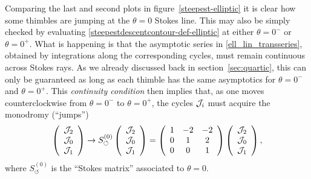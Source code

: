 \documentclass[11pt,a4paper]{article}
\newcommand{\CJ}{{\cal J}}
\begin{document}
Comparing the last and second plots in figure~\ref{steepest-elliptic} it is clear how some thimbles are jumping at the $\theta=0$ Stokes line. This may also be simply checked by evaluating \eqref{steepestdescentcontour-def-elliptic} at either $\theta=0^-$ or $\theta=0^+$. What is happening is that the asymptotic series in \eqref{ell_lin_transseries}, obtained by integrations along the corresponding cycles, must remain continuous across Stokes rays. As we already discussed back in section~\ref{sec:quartic}, this can only be guaranteed as long as each thimble has the same asymptotics for $\theta=0^-$ and $\theta=0^+$. This \textit{continuity condition} then implies that, as one moves counterclockwise from $\theta=0^-$ to $\theta=0^+$, the cycles $\CJ_i$ must acquire the monodromy (``jumps'')
%
\begin{equation}
\label{ell-monodromy-0}
\left(
\begin{array}{ccc}
\CJ_2 \\
\CJ_0 \\
\CJ_1
\end{array}
\right) \to S_{\circlearrowleft}^{(0)} \left(
\begin{array}{ccc}
\CJ_2 \\
\CJ_0 \\
\CJ_1
\end{array}
\right) = \left(
\begin{array}{ccc}
1 & -2 & -2 \\
0 &  1 &  2 \\
0 &  0 &  1
\end{array}
\right) \left(
\begin{array}{ccc}
\CJ_2 \\
\CJ_0 \\
\CJ_1
\end{array}
\right),
\end{equation}
%
\noindent
where $S_{\circlearrowleft}^{(0)}$ is the ``Stokes matrix'' associated to $\theta=0$.
\end{document}
